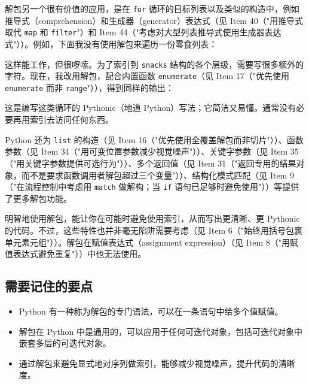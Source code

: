 解包另一个很有价值的应用，是在 \texttt{for} 循环的目标列表以及类似的构造中，例如推导式（comprehension）和生成器（generator）表达式（见 Item 40（"用推导式取代 \texttt{map} 和 \texttt{filter}"）和 Item 44（"考虑对大型列表推导式使用生成器表达式"））。例如，下面我没有使用解包来遍历一份零食列表：


这样能工作，但很啰嗦。为了索引到 \texttt{snacks} 结构的各个层级，需要写很多额外的字符。现在，我改用解包，配合内置函数 \texttt{enumerate}（见 Item 17（"优先使用 \texttt{enumerate} 而非 \texttt{range}"）），得到同样的输出：


这是编写这类循环的 Pythonic（地道 Python）写法；它简洁又易懂。通常没有必要再用索引去访问任何东西。

Python 还为 \texttt{list} 的构造（见 Item 16（"优先使用全覆盖解包而非切片"））、函数参数（见 Item 34（"用可变位置参数减少视觉噪声"））、关键字参数（见 Item 35（"用关键字参数提供可选行为"））、多个返回值（见 Item 31（"返回专用的结果对象，而不是要求函数调用者解包超过三个变量"））、结构化模式匹配（见 Item 9（"在流程控制中考虑用 \texttt{match} 做解构；当 \texttt{if} 语句已足够时避免使用"））等提供了更多解包功能。

明智地使用解包，能让你在可能时避免使用索引，从而写出更清晰、更 Pythonic 的代码。不过，这些特性也并非毫无陷阱需要考虑（见 Item 6（"始终用括号包裹单元素元组"））。解包在赋值表达式（assignment expression）（见 Item 8（"用赋值表达式避免重复"））中也无法使用。

\subsection{需要记住的要点}

\begin{itemize}
\item Python 有一种称为解包的专门语法，可以在一条语句中给多个值赋值。
\item 解包在 Python 中是通用的，可以应用于任何可迭代对象，包括可迭代对象中嵌套多层的可迭代对象。
\item 通过解包来避免显式地对序列做索引，能够减少视觉噪声，提升代码的清晰度。
\end{itemize}

